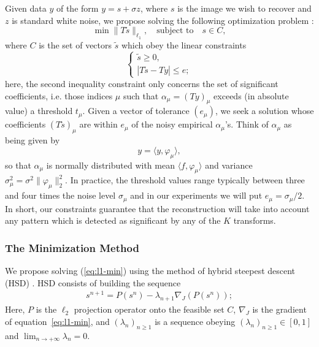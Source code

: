 Given data $y$ of the form $y = s + \sigma z$, where $s$ is the image
we wish to recover and $z$ is standard white noise, we propose solving
the following optimization problem \cite{starck:spie01a}:
\begin{equation}
  \label{eq:l1-min}
  \min \|T\tilde{s}\|_{\ell_1}, \quad \mbox{subject to} \quad s \in C,  
\end{equation}
where $C$ is the set of vectors $\tilde{s}$ 
which obey the linear constraints
\begin{equation}
\label{eq:constraints}
\left\{  \begin{array}{ll}
  \tilde{s} \ge 0, \\
  |T\tilde{s} - Ty| \le e; 
  \end{array}
  \right. 
\end{equation}
here, the second inequality constraint 
only concerns the set of significant coefficients, 
i.e. those indices $\mu$ such that $\alpha_\mu =
(Ty)_\mu$ exceeds (in absolute value) a threshold $t_\mu$. Given a
vector of tolerance $(e_\mu)$, we seek a solution whose coefficients
  $(T\tilde{s})_\mu$ are within $e_\mu$ of the noisy
empirical $\alpha_\mu$'s.  Think of $\alpha_\mu$ as being given by
\[
y = \langle y, \varphi_\mu \rangle, 
\]
so that $\alpha_\mu$ is normally distributed with mean $\langle f,
\varphi_\mu \rangle$ and variance $\sigma^2_\mu = \sigma^2
\|\varphi_\mu\|^2_2$. In practice, the threshold values range
typically between three and four times the noise level $\sigma_\mu$
and in our experiments we will put $e_\mu = \sigma_\mu/2$. In short,
our constraints guarantee that the reconstruction will take into
account any pattern which is detected as significant by  any of the
$K$ transforms.
   
\subsubsection*{The Minimization Method}

We propose solving (\ref{eq:l1-min}) using the method of hybrid
steepest descent (HSD) \cite{wave:yamada01}. HSD consists of building
the sequence
\begin{eqnarray}
 s^{n+1} = P(s^{n}) - \lambda_{n+1} \nabla_J(P(s^{n})); 
\end{eqnarray}
Here, $P$ is the $\ell_2$ projection operator onto the feasible set
$C$, $\nabla_J$ is the gradient of equation~\ref{eq:l1-min}, and
$(\lambda_{n})_{n \ge 1}$ is a sequence obeying $(\lambda_{n})_{n\ge
  1} \in [0,1] $ and $\lim_{ n \rightarrow + \infty } \lambda_{n} = 0$.

